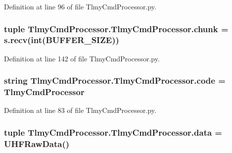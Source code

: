 Definition at line 96 of file Tlmy\+Cmd\+Processor.\+py.

\hypertarget{namespace_tlmy_cmd_processor_1_1_tlmy_cmd_processor_a1ed237493e0f74a1a922ee4b54ef0657}{}
\subsubsection[{chunk}]{\setlength{\rightskip}{0pt plus 5cm}tuple Tlmy\+Cmd\+Processor.\+Tlmy\+Cmd\+Processor.\+chunk = s.\+recv(int({\bf B\+U\+F\+F\+E\+R\+\_\+\+S\+I\+Z\+E}))}\label{namespace_tlmy_cmd_processor_1_1_tlmy_cmd_processor_a1ed237493e0f74a1a922ee4b54ef0657}


Definition at line 142 of file Tlmy\+Cmd\+Processor.\+py.

\hypertarget{namespace_tlmy_cmd_processor_1_1_tlmy_cmd_processor_a4b093dcc82bbec72c8869f3715934d92}{}
\subsubsection[{code}]{\setlength{\rightskip}{0pt plus 5cm}string Tlmy\+Cmd\+Processor.\+Tlmy\+Cmd\+Processor.\+code = \textquotesingle{}Tlmy\+Cmd\+Processor\textquotesingle{}}\label{namespace_tlmy_cmd_processor_1_1_tlmy_cmd_processor_a4b093dcc82bbec72c8869f3715934d92}


Definition at line 83 of file Tlmy\+Cmd\+Processor.\+py.

\hypertarget{namespace_tlmy_cmd_processor_1_1_tlmy_cmd_processor_aa2dfd09891072d77d04b841a8bed1462}{}
\subsubsection[{data}]{\setlength{\rightskip}{0pt plus 5cm}tuple Tlmy\+Cmd\+Processor.\+Tlmy\+Cmd\+Processor.\+data = {\bf U\+H\+F\+Raw\+Data}()}\label{namespace_tlmy_cmd_processor_1_1_tlmy_cmd_processor_aa2dfd09891072d77d04b841a8bed1462}


